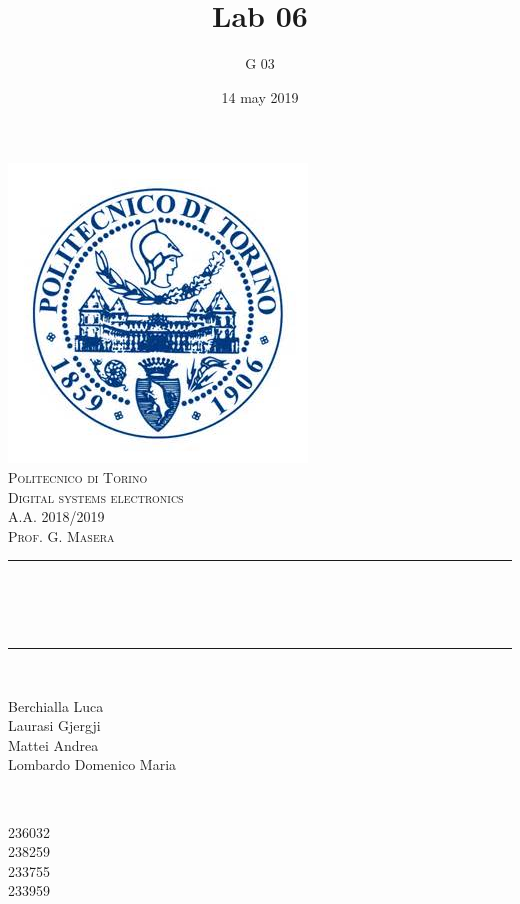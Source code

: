 \documentclass[12pt]{article}
\title{Lab 06}													%
\author{G 03}														%
\date{14 may 2019}														%
\makeatletter
\let\thetitle\@title
\let\thedate\@date
\makeatother
\begin{document}

\begin{titlepage}
	\centering
    \vspace*{0.5 cm}
    \includegraphics[scale = 0.75]{polito.jpg}\\[1.0 cm]				%
    \textsc{\LARGE Politecnico di Torino}\\[2.0 cm]						%
	\textsc{\Large Digital systems electronics\\ A.A. 2018/2019}\\[0.5 cm]		%
	\textsc{\Large Prof. G. Masera}\\[0.5 cm]		%
	\rule{\linewidth}{0.2 mm} \\[0.4 cm]
	{ \huge \bfseries \thetitle \\ \small \thedate}\\
	\rule{\linewidth}{0.2 mm} \\[1.5 cm]
	
	\begin{minipage}{0.4\textwidth}
		\begin{flushleft} \large
			Berchialla Luca\\												%
			Laurasi Gjergji
			\\
			
			Mattei Andrea\\
            Lombardo Domenico Maria\\
            
			\end{flushleft}
			\end{minipage}~
			\begin{minipage}{0.4\textwidth}
            
			\begin{flushright} \large
			236032\\													%
			238259\\
            233755\\
            233959\\
            
		\end{flushright}
        
	\end{minipage}\\[2 cm]
	
\end{titlepage}
\end{document}
